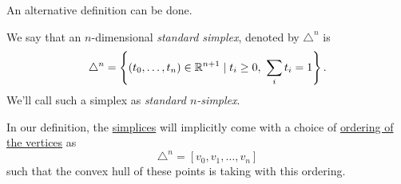 An alternative definition can be done.
\begin{definition}\label{def:standard-simplex}
	We say that an \(n\)-dimensional \emph{standard simplex}, denoted by \(\triangle^n\) is
	\[
		\triangle^n = \left\{(t_0, \ldots , t_{n}) \in \mathbb{\MakeUppercase{r}}^{n+1} \mid t_i \geq 0,\ \sum\limits_{i}t_{i}  = 1 \right\}.
	\]
	We'll call such a simplex as \emph{standard \(n\)-simplex}.
	\begin{figure}[H]
		\centering
		\label{fig:def:standard-simplex}
	\end{figure}
\end{definition}
\begin{remark}
	In our definition, the \hyperref[def:standard-simplex]{simplices} will implicitly come with a choice of \underline{ordering of the vertices} as
	\[
		\triangle ^n = [v_0, v_1, \ldots , v_n ]
	\]
	such that the convex hull of these points is taking with this ordering.
\end{remark}
